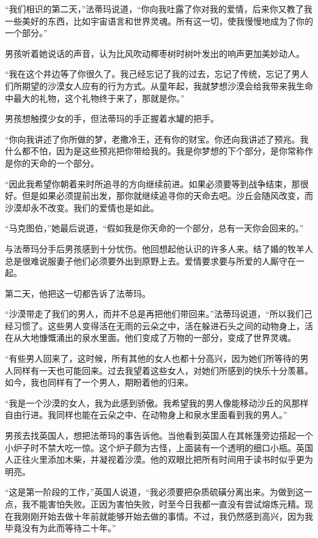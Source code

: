 \documentclass[twoside,openany]{book}
\begin{document}
“我们相识的第二天，”法蒂玛说道，“你向我吐露了你对我的爱情，后来你又教了我一些美好的东西，比如宇宙语言和世界灵魂。所有这一切，使我慢慢地成为了你的一个部分。”

男孩听着她说话的声音，认为比风吹动椰枣树时树叶发出的响声更加美妙动人。

“我在这个井边等了你很久了。我己经忘记了我的过去，忘记了传统，忘记了男人们所期望的沙漠女人应有的行为方式。从童年起，我就梦想沙漠会给我带来我生命中最大的礼物，这个礼物终于来了，那就是你。”

男孩想触摸少女的手，但法蒂玛的手正握着水罐的把手。

“你向我讲述了你所做的梦，老撒冷王，还有你的财宝。你还向我讲述了预兆。我什么都不怕，因为是这些预兆把你带给我的。我是你梦想的下个部分，是你常称作是你的天命的一个部分。

“因此我希望你朝着来时所追寻的方向继续前进。如果必须要等到战争结束，那很好。但是如果必须提前出发，那你就继续追寻你的天命去吧。沙丘会随风改变，而沙漠却永不改变。我们的爱情也是如此。

“马克图伯，”她最后说道，“假如我是你天命的一个部分，总有一天你会回来的。”

与法蒂玛分手后男孩感到十分忧伤。他回想起他认识的许多人来。结了婚的牧羊人总是很难说服妻子他们必须要外出到原野上去。爱情要求要与所爱的人厮守在一起。

第二天，他把这一切都告诉了法蒂玛。

“沙漠带走了我们的男人，而并不总是再把他们带回来。”法蒂玛说道，“所以我们己经习惯了。这些男人变得活在无雨的云朵之中，活在躲进石头之间的动物身上，活在从大地慷慨涌出的泉水里面。他们变成了万物的一部分，变成了世界灵魂。

“有些男人回来了，这时候，所有其他的女人也都十分高兴，因为她们所等待的男人同样有一天也可能回来。过去我望着这些女人，对她们所感到的快乐十分羡慕。如今，我也同样有了一个男人，期盼着他的归来。

“我是一个沙漠的女人，我为此感到骄傲。我希望我的男人像能移动沙丘的风那样自由行进。我同样也能在云朵之中、在动物身上和泉水里面看到我的男人。”

男孩去找英国人，想把法蒂玛的事告诉他。当他看到英国人在其帐篷旁边搭起一个小炉子时不禁大吃一惊。这个炉子颇为古怪，上面装有一个透明的细口小瓶。英国人正往火里添加木柴，并凝视着沙漠。他的双眼比把所有时间用于读书时似乎更为明亮。

“这是第一阶段的工作，”英国人说道，“我必须要把杂质硫磺分离出来。为做到这一点，我不能害怕失败。正因为害怕失败，时至今日我都一直没有尝试熔炼元精。现在我刚刚开始去做十年前就能够开始去做的事情。不过，我仍然感到高兴，因为我毕竟没有为此而等待二十年。”
\end{document}
